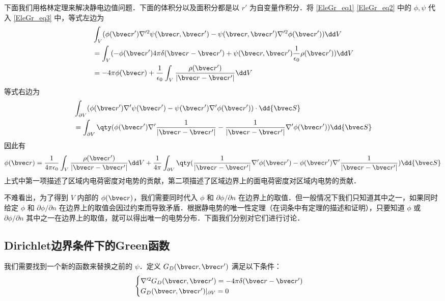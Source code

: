 下面我们用格林定理来解决静电边值问题．下面的体积分以及面积分都是以 $r'$ 为自变量作积分．将 \autoref{EleGr_eq1} \autoref{EleGr_eq2} 中的 $\phi,\psi$ 代入 \autoref{EleGr_eq3}  中，等式左边为
\begin{equation}
\begin{aligned}
&\int_V(\phi(\bvec r')\nabla'^2\psi(\bvec r,\bvec r')-\psi(\bvec r,\bvec r')\nabla'^2\phi(\bvec r'))\dd V
\\
&=\int_V(-\phi(\bvec r')4\pi \delta(\bvec r-\bvec r')+\psi(\bvec r,\bvec r')\frac{1}{\epsilon_0}\rho(\bvec r'))\dd V\\
&=-4\pi\phi(\bvec r)+\frac{1}{\epsilon_0}\int_V\frac{\rho(\bvec r')}{|\bvec r-\bvec r'|}\dd V
\end{aligned}
\end{equation}
等式右边为
\begin{equation}
\begin{aligned}
&\int_{\partial V}(\phi(\bvec r')\nabla'\psi(\bvec r')-\psi(\bvec r')\nabla'\phi(\bvec r'))\cdot \dd {\bvec S}\\
&=\int_{\partial V}\qty(\phi(\bvec r')\nabla'\frac{1}{|\bvec r-\bvec r'|}-\frac{1}{|\bvec r-\bvec r'|}\nabla'\phi(\bvec r'))\dd {\bvec S}
\end{aligned}
\end{equation}
因此有
\begin{equation}
\phi(\bvec r)=\frac{1}{4\pi\epsilon_0}\int_V\frac{\rho(\bvec r')}{|\bvec r-\bvec r'|}\dd V+\frac{1}{4\pi}\int_{\partial V}\qty(\frac{1}{|\bvec r-\bvec r'|}\nabla'\phi(\bvec r')-\phi(\bvec r')\nabla'\frac{1}{|\bvec r-\bvec r'|})\dd {\bvec S}
\end{equation}
上式中第一项描述了区域内电荷密度对电势的贡献，第二项描述了区域边界上的面电荷密度对区域内电势的贡献．

不难看出，为了得到 $V$ 内部的 $\phi(\bvec r)$，我们需要同时代入 $\phi$ 和 $\partial \phi/\partial n$ 在边界上的取值．但一般情况下我们只知道其中之一，如果同时给定 $\phi$ 和 $\partial \phi/\partial n$ 在边界上的取值会因过约束而导致矛盾．根据静电势的唯一性定理（在词条中有定理的描述和证明），只要知道 $\phi$ 或 $\partial \phi/\partial n$ 其中之一在边界上的取值，就可以得出唯一的电势分布．下面我们分别对它们进行讨论．

\subsection{Dirichlet边界条件下的Green函数}

我们需要找到一个新的函数来替换之前的 $\psi$．定义 $G_D(\bvec r,\bvec r')$ 满足以下条件：
\begin{equation}\label{EleGr_eq6}
\begin{cases}
\nabla'^2G_D(\bvec r,\bvec r')=-4\pi\delta(\bvec r-\bvec r')\\
G_D(\bvec r,\bvec r')|_{\partial V}=0
\end{cases}
\end{equation}

